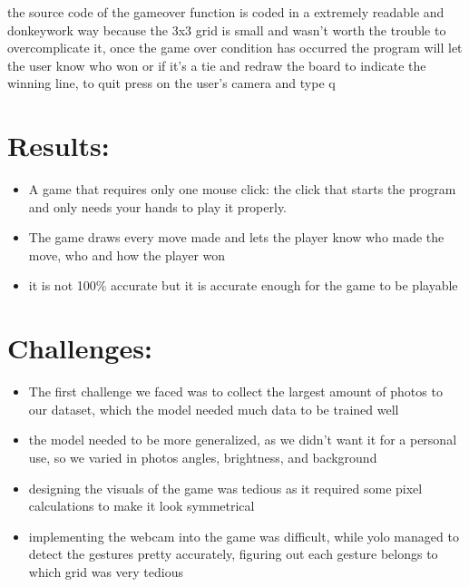 \documentclass[11pt]{article}
\begin{document}
 the source code of the gameover function is coded in a extremely readable and donkeywork way because the 3x3 grid is small and wasn't worth the trouble to overcomplicate it, once the game over condition has occurred the program will let the user know who won or if it's a tie and redraw the board to indicate the winning line, to quit press on the user's camera and type q


\section{Results:}
\begin{itemize}
  \item A game that requires only one mouse click: the click that starts the program and only needs your hands to play it properly. 
  \item The game draws every move made and lets the player know who made the move, who and how the player won
  \item it is not 100\% accurate but it is accurate enough for the game to be playable
\end{itemize}
\section{Challenges:}
\begin{itemize}
  \item The first challenge we faced was to collect the largest amount of photos to our dataset, which the model needed much data to be trained well
  \item the model needed to be more generalized, as we didn't want it for a personal use, so we varied in photos angles, brightness, and background 
  \item designing the visuals of the game was tedious as it required some pixel calculations to make it look symmetrical
  \item implementing the webcam into the game was difficult, while yolo managed to detect the gestures pretty accurately, figuring out each gesture belongs to which grid was very tedious

\end{itemize}
\end{document}
